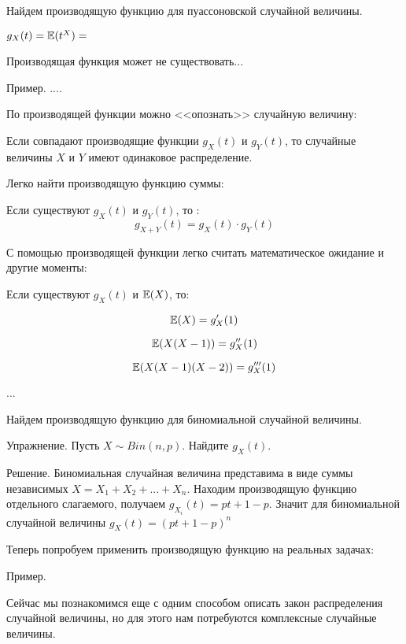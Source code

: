 {Найдем производящую функцию для пуассоновской случайной величины.

$ g_{X}(t)=\mathbb{E}(t^{X})= $



Производящая функция может не существовать...

Пример. ....



По производящей функции можно <<опознать>> случайную величину:
\begin{myth}
Если совпадают производящие функции $ g_{X}(t) $ и $ g_{Y}(t) $, то случайные величины $ X $ и $ Y $ имеют одинаковое распределение.
\end{myth}


Легко найти производящую функцию суммы:
\begin{myth}
Если существуют $ g_{X}(t) $ и $ g_{Y}(t) $, то :
\[g_{X+Y}(t)=g_{X}(t)\cdot g_{Y}(t)\]
\end{myth}


С помощью производящей функции легко считать математическое ожидание и другие моменты:
\begin{myth}
Если существуют $ g_{X}(t) $ и $ \mathbb{E}(X) $, то:

\[ \mathbb{E}(X)=g'_{X}(1) \]

\[ \mathbb{E}(X(X-1))=g''_{X}(1) \]

\[ \mathbb{E}(X(X-1)(X-2))=g'''_{X}(1) \]

...

\end{myth}


Найдем производящую функцию для биномиальной случайной величины.

Упражнение. Пусть $ X \sim Bin(n,p)$. Найдите $ g_{X}(t) $.

Решение. Биномиальная случайная величина представима в виде суммы независимых $ X=X_{1}+X_{2}+...+X_{n} $. Находим производящую функцию отдельного слагаемого, получаем $ g_{X_{i}}(t)=pt+1-p $. Значит для биномиальной случайной величины $ g_{X}(t)=(pt+1-p)^{n} $




Теперь попробуем применить производящую функцию на реальных задачах:

Пример.






Сейчас мы познакомимся еще с одним способом описать закон распределения случайной величины, но для этого нам потребуются комплексные случайные величины.





}
